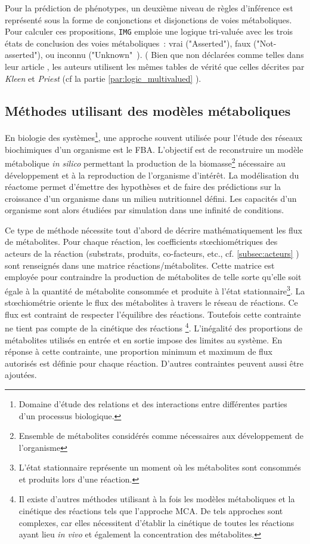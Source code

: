 \begin{refsegment}
    Pour la prédiction de phénotypes, un deuxième niveau de règles d'inférence est représenté sous la forme de conjonctions et disjonctions de voies métaboliques. Pour calculer ces propositions, \texttt{IMG} emploie une logique tri-valuée avec les trois états de conclusion des voies métaboliques : vrai ("Asserted"), faux ("Not-asserted"), ou inconnu ("Unknown" ).
     (
    Bien que non déclarées comme telles dans leur article , les auteurs utilisent les mêmes tables de vérité que celles décrites par \textit{Kleen} et \textit{Priest} (cf la partie \ref{par:logic_multivalued}  ). 
    
    \subsection{Méthodes utilisant des modèles métaboliques}
    
    En biologie des systèmes\footnote{Domaine d'étude des relations et des interactions entre différentes parties d'un processus biologique.}, une approche souvent utilisée pour l'étude des réseaux biochimiques d'un organisme est le \gls{FBA}\cite{orth2010flux}. L'objectif est de reconstruire un modèle métabolique \textit{in silico} permettant la production de la biomasse\footnote{Ensemble de métabolites considérés comme nécessaires aux développement de l'organisme} nécessaire au développement et à la reproduction de l'organisme d'intérêt. La modélisation du réactome permet d'émettre des hypothèses et de faire des prédictions sur la croissance d'un organisme dans un milieu nutritionnel défini. Les capacités d'un organisme sont alors étudiées par simulation dans une infinité de conditions.
    
    Ce type de méthode nécessite tout d'abord de décrire mathématiquement les flux de métabolites. Pour chaque réaction, les coefficients stœchiométriques des acteurs de la réaction (substrats, produits, co-facteurs, etc., cf. \cref{subsec:acteurs} ) sont renseignés dans une matrice réactions/métabolites. Cette matrice est employée pour contraindre la production de métabolites de telle sorte qu'elle soit égale à la quantité de métabolite consommée et produite à l'état stationnaire\footnote{L'état stationnaire représente un moment où les métabolites sont consommés et produits lors d'une réaction.}. La stœchiométrie oriente le flux des métabolites à travers le réseau de réactions. Ce flux est contraint de respecter l'équilibre des réactions. Toutefois cette contrainte ne tient pas compte de la cinétique des réactions \cite{covert2001metabolic,edwards2002metabolic}\footnote{Il existe d'autres méthodes utilisant à la fois les modèles métaboliques et la cinétique des réactions tels que l'approche \gls{MCA}. De tels approches sont complexes, car elles nécessitent d'établir la cinétique de toutes les réactions ayant lieu \textit{in vivo} et également la concentration des métabolites.}. L'inégalité des proportions de métabolites utilisés en entrée et en sortie impose des limites au système. En réponse à cette contrainte, une proportion minimum et maximum de flux autorisés est définie pour chaque réaction. D'autres contraintes peuvent aussi être ajoutées.
    

\end{refsegment}
